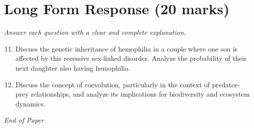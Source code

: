 \documentclass[12pt]{article}
\begin{document}
\section*{Long Form Response (20 marks)}
\textit{Answer each question with a clear and complete explanation.}
\begin{enumerate}[label=\arabic*.]
\setcounter{enumi}{10}
\item Discuss the genetic inheritance of hemophilia in a couple where one son is affected by this recessive sex-linked disorder. Analyze the probability of their next daughter also having hemophilia.
\item Discuss the concept of coevolution, particularly in the context of predator-prey relationships, and analyze its implications for biodiversity and ecosystem dynamics.
\end{enumerate}

\vfill
\noindent\textit{End of Paper}
\end{document}
